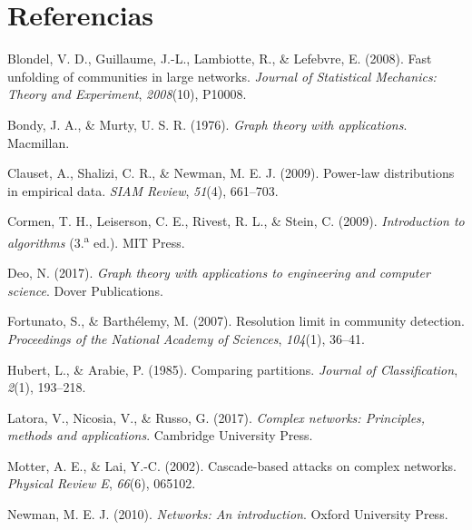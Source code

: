 \documentclass[10pt,a4paper]{extarticle}
\begin{document}
\section*{Referencias}

\begin{list}{}{\leftmargin=1.2cm \itemindent=-1.2cm \itemsep=2mm}

\item Blondel, V. D., Guillaume, J.-L., Lambiotte, R., \& Lefebvre, E. (2008). Fast
unfolding of communities in large networks. \textit{Journal of Statistical Mechanics: Theory
and Experiment}, \textit{2008}(10), P10008.

\item Bondy, J. A., \& Murty, U. S. R. (1976). \textit{Graph theory with applications}.
Macmillan.

\item Clauset, A., Shalizi, C. R., \& Newman, M. E. J. (2009). Power-law distributions in
empirical data. \textit{SIAM Review}, \textit{51}(4), 661--703.

\item Cormen, T. H., Leiserson, C. E., Rivest, R. L., \& Stein, C. (2009). \textit{Introduction
to algorithms} (3.\textsuperscript{a} ed.). MIT Press.

\item Deo, N. (2017). \textit{Graph theory with applications to engineering and computer
science}. Dover Publications.

\item Fortunato, S., \& Barthélemy, M. (2007). Resolution limit in community detection.
\textit{Proceedings of the National Academy of Sciences}, \textit{104}(1), 36--41.

\item Hubert, L., \& Arabie, P. (1985). Comparing partitions. \textit{Journal of
Classification}, \textit{2}(1), 193--218.

\item Latora, V., Nicosia, V., \& Russo, G. (2017). \textit{Complex networks: Principles,
methods and applications}. Cambridge University Press.

\item Motter, A. E., \& Lai, Y.-C. (2002). Cascade-based attacks on complex networks.
\textit{Physical Review E}, \textit{66}(6), 065102.

\item Newman, M. E. J. (2010). \textit{Networks: An introduction}. Oxford University Press.


\end{list}
\end{document}
